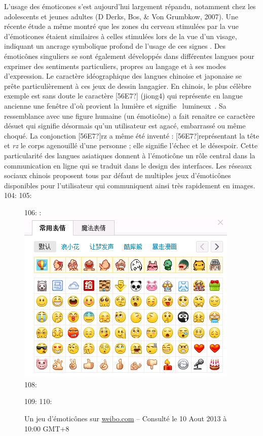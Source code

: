 L{\textquoteright}usage des \'emoticones s{\textquoteright}est aujourd{\textquoteright}hui largement r\'epandu, notamment chez les adolescents et jeunes adultes (D Derks, Bos, \& Von Grumbkow, 2007). Une r\'ecente \'etude a m\^eme montr\'e que les zones du cerveau stimul\'ees par la vue d{\textquoteright}\'emoticones \'etaient similaires \`a celles stimul\'ees lors de la vue d{\textquoteright}un visage, indiquant un ancrage symbolique profond de l{\textquoteright}usage de ces signes \cite{Churches2014}. Des \'emotic\^ones singuliers se sont \'egalement d\'evelopp\'es dans diff\'erentes langues pour exprimer des sentiments particuliers, propres au langage et \`a ses modes d{\textquoteright}expression. Le caract\`ere id\'eographique des langues chinoise et japonaise se pr\^ete particuli\`erement \`a ces jeux de dessin langagier. En chinois, le plus c\'el\`ebre exemple est sans doute le caract\`ere [56E7?] (jiong4) qui repr\'esente en langue ancienne une fen\^etre d{\textquoteright}o\`u provient la lumi\`ere et signifie {\guillemotleft}~lumineux~{\guillemotright}. Sa ressemblance avec une figure humaine (un \'emotic\^one) a fait renaitre ce caract\`ere d\'esuet qui signifie d\'esormais qu{\textquoteright}un utilisateur est agac\'e, embarrass\'e ou m\^eme choqu\'e. La conjonction {\textquotedbl}[56E7?]rz{\textquotedbl} a m\^eme \'et\'e invent\'e : [56E7?]repr\'esentant la t\^ete et \textit{rz} le corps agenouill\'e d{\textquoteright}une personne ; elle signifie l{\textquoteright}\'echec et le d\'esespoir. Cette particularit\'e des langues asiatiques donnent \`a l{\textquoteright}\'emotic\^one un r\^ole central dans la communication en ligne qui se traduit dans le design des interfaces. Les r\'eseaux sociaux chinois proposent tous par d\'efaut de multiples jeux d{\textquoteright}\'emotic\^ones disponibles pour l{\textquoteright}utilisateur qui communiquent ainsi tr\`es rapidement en images.  
104: 
105: \begin{figure}[h]
106:     :     \includegraphics[width=4.1669in,height=3.278in]{figures/chap2/chapitre2-img1.png}
108:     \caption[Un jeu d{\textquoteright}\'emotic\^ones de Weibo]{Un jeu d{\textquoteright}\'emotic\^ones sur \url{weibo.com} -- Consult\'e le 10 Aout 2013 \`a 10:00 GMT+8}
109:     \label{fig:emoticons-weibo}
110: \end{figure}
